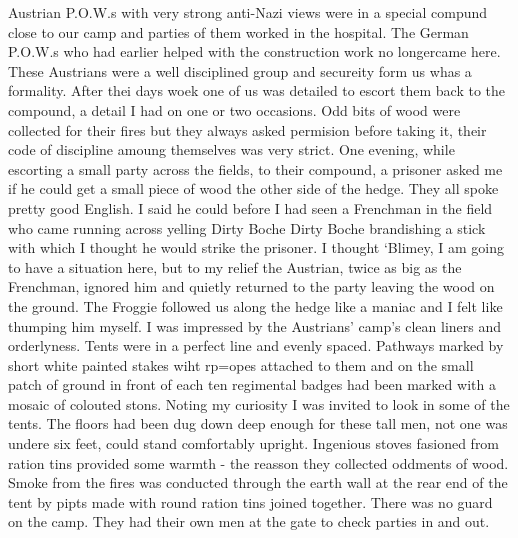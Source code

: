 Austrian P.O.W.s with very strong anti-Nazi views were in a special
compund close to our camp and parties of them worked in the
hospital. The German P.O.W.s who had earlier helped with the
construction work no longercame here. These Austrians were a well
disciplined group and secureity form us whas a formality. After thei
days woek one of us was detailed to escort them back to the compound,
a detail I had on one or two occasions. Odd bits of wood were
collected for their fires but they always asked permision before
taking it, their code of discipline amoung themselves was very
strict. One evening, while escorting a small party across the fields,
to their compound, a prisoner asked me if he could get a small piece
of wood the other side of the hedge. They all spoke pretty good
English. I said he could before I had seen a Frenchman in the field
who came running across yelling Dirty Boche Dirty Boche brandishing a
stick with which I thought he would strike the prisoner. I thought
`Blimey, I am going to have a situation here, but to my relief the
Austrian, twice as big as the Frenchman, ignored him and quietly
returned to the party leaving the wood on the ground. The Froggie
followed us along the hedge like a maniac and I felt like thumping him
myself. I was impressed by the Austrians' camp's clean liners and
orderlyness. Tents were in a perfect line and evenly spaced. Pathways
marked by short white painted stakes wiht rp=opes attached to them and
on the small patch of ground in front of each ten regimental badges
had been marked with a mosaic of colouted stons. Noting my curiosity I
was invited to look in some of the tents. The floors had been dug down
deep enough for these tall men, not one was undere six feet, could
stand comfortably upright. Ingenious stoves fasioned from ration tins
provided some warmth - the reasson they collected oddments of
wood. Smoke from the fires was conducted through the earth wall at the
rear end of the tent by pipts made with round ration tins joined
together. There was no guard on the camp. They had their own men at
the gate to check parties in and out.

